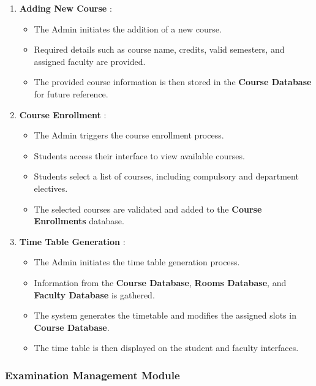 \documentclass[12pt,a4paper]{article}
\begin{document}
\begin{enumerate}
	\item \textbf{Adding New Course} : 
		\begin{itemize}
			\item The Admin initiates the addition of a new course.
			\item Required details such as course name, credits, valid semesters, and assigned faculty are provided.
			\item The provided course information is then stored in the \textbf{Course Database} for future reference.
		\end{itemize}
	\item \textbf{Course Enrollment} :
		\begin{itemize}
			\item The Admin triggers the course enrollment process.
			\item Students access their interface to view available courses.
			\item Students select a list of courses, including compulsory and department electives.
			\item The selected courses are validated and added to the \textbf{Course Enrollments} database.
		\end{itemize}
	\item \textbf{Time Table Generation} :
		\begin{itemize}
			\item The Admin initiates the time table generation process.
			\item Information from the \textbf{Course Database}, \textbf{Rooms Database}, and \textbf{Faculty Database} is gathered.
			\item The system generates the timetable and modifies the assigned slots in \textbf{Course Database}.
			\item The time table is then displayed on the student and faculty interfaces.
		\end{itemize}
	
\end{enumerate}

\subsubsection{Examination Management Module}
\end{document}
